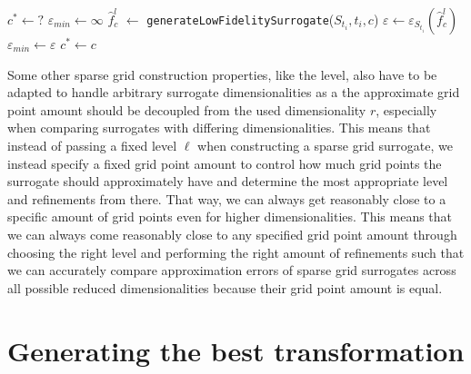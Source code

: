 \documentclass[
  a4paper,  %
  twoside,  %
  bibliography=totoc,
  headsepline,
  cleardoublepage=empty,
  parskip=half,
  draft=false
]{scrbook}
\begin{document}
\begin{mdframed}[style=algstyle,frametitle={\textbf{function} \texttt{generateBestSurrogate}{$(S_{t_i}, t_i)$}}]
\normalsize
\vspace{5.5mm}
\begin{algorithmic}[1]
    \State $c^\ast \gets ?$
    \State $\varepsilon_{min} \gets \infty$
      \State $\hat{f}_c^l$ $\gets$ \texttt{generateLowFidelitySurrogate}($S_{t_i}, t_i, c$)
    	\State $\varepsilon \gets \varepsilon_{S_{t_i}}(\hat{f}_c^l)$
    	  \State $\varepsilon_{min}\gets \varepsilon$
    	\State $c^\ast \gets c$
    	\EndIf
    \EndFor
    \State {}
\end{algorithmic}
\vspace{-1.5mm}
\delimit
	\label{alg:bestsur}
\end{mdframed}
%
Some other sparse grid construction properties, like the level, also have to be adapted to handle arbitrary surrogate dimensionalities as a the approximate grid point amount should be decoupled from the used dimensionality $r$, especially when comparing surrogates with differing dimensionalities.
This means that instead of passing a fixed level $\ell$ when constructing a sparse grid surrogate, we instead specify a fixed grid point amount to control how much grid points the surrogate should approximately have and determine the most appropriate level and refinements from there.
That way, we can always get reasonably close to a specific amount of grid points even for higher dimensionalities.
This means that we can always come reasonably close to any specified grid point amount through choosing the right level and performing the right amount of refinements such that we can accurately compare approximation errors of sparse grid surrogates across all possible reduced dimensionalities because their grid point amount is equal.


\section{Generating the best transformation}
\label{sec:trans_gen}
\end{document}

